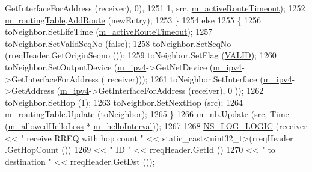 \begin{DoxyCode}
      GetInterfaceForAddress (receiver), 0),
1251                                               1, src, \hyperlink{classns3_1_1aodv_1_1RoutingProtocol_a37ec921ef1c48e4d8e7072fe989613d2}{m\_activeRouteTimeout});
1252       \hyperlink{classns3_1_1aodv_1_1RoutingProtocol_a4e1003a34c8adc96db71096d88c98ae0}{m\_routingTable}.\hyperlink{classns3_1_1aodv_1_1RoutingTable_a579e562e38e67d510de1ff2c87806c76}{AddRoute} (newEntry);
1253     \}
1254   \textcolor{keywordflow}{else}
1255     \{
1256       toNeighbor.SetLifeTime (\hyperlink{classns3_1_1aodv_1_1RoutingProtocol_a37ec921ef1c48e4d8e7072fe989613d2}{m\_activeRouteTimeout});
1257       toNeighbor.SetValidSeqNo (\textcolor{keyword}{false});
1258       toNeighbor.SetSeqNo (rreqHeader.GetOriginSeqno ()); 
1259       toNeighbor.SetFlag (\hyperlink{group__aodv_gga44216921a9c725a5ab8bc19059052a26af5fecee96bb2650aa417994840b43c99}{VALID});
1260       toNeighbor.SetOutputDevice (\hyperlink{classns3_1_1aodv_1_1RoutingProtocol_aee33006b1f9d8b24d4722037ff3fec98}{m\_ipv4}->GetNetDevice (\hyperlink{classns3_1_1aodv_1_1RoutingProtocol_aee33006b1f9d8b24d4722037ff3fec98}{m\_ipv4}->GetInterfaceForAddress (
      receiver)));
1261       toNeighbor.SetInterface (\hyperlink{classns3_1_1aodv_1_1RoutingProtocol_aee33006b1f9d8b24d4722037ff3fec98}{m\_ipv4}->GetAddress (\hyperlink{classns3_1_1aodv_1_1RoutingProtocol_aee33006b1f9d8b24d4722037ff3fec98}{m\_ipv4}->GetInterfaceForAddress (receiver), 0
      ));
1262       toNeighbor.SetHop (1);
1263       toNeighbor.SetNextHop (src);
1264       \hyperlink{classns3_1_1aodv_1_1RoutingProtocol_a4e1003a34c8adc96db71096d88c98ae0}{m\_routingTable}.\hyperlink{classns3_1_1aodv_1_1RoutingTable_a39fb5335110164f4c1b97682a3812dc1}{Update} (toNeighbor);
1265     \}
1266   \hyperlink{classns3_1_1aodv_1_1RoutingProtocol_ac1f61cf6b680f2fe8c82983d18bfd3cd}{m\_nb}.\hyperlink{classns3_1_1aodv_1_1Neighbors_a88577f05c06fbff8cf9ed281e9077f6e}{Update} (src, \hyperlink{namespacens3_1_1TracedValueCallback_a7ffd3e7c142ffe7c8a1d2db9b8de38ec}{Time} (\hyperlink{classns3_1_1aodv_1_1RoutingProtocol_a80e1dc9b9a640570ba5d5270846a2f6f}{m\_allowedHelloLoss} * 
      \hyperlink{classns3_1_1aodv_1_1RoutingProtocol_aa9750612eb154b537b1d7d0350cb8912}{m\_helloInterval}));
1267 
1268   \hyperlink{group__logging_ga88acd260151caf2db9c0fc84997f45ce}{NS\_LOG\_LOGIC} (receiver << \textcolor{stringliteral}{" receive RREQ with hop count "} << static\_cast<uint32\_t>(rreqHeader
      .GetHopCount ()) 
1269                          << \textcolor{stringliteral}{" ID "} << rreqHeader.GetId ()
1270                          << \textcolor{stringliteral}{" to destination "} << rreqHeader.GetDst ());

\end{DoxyCode}
